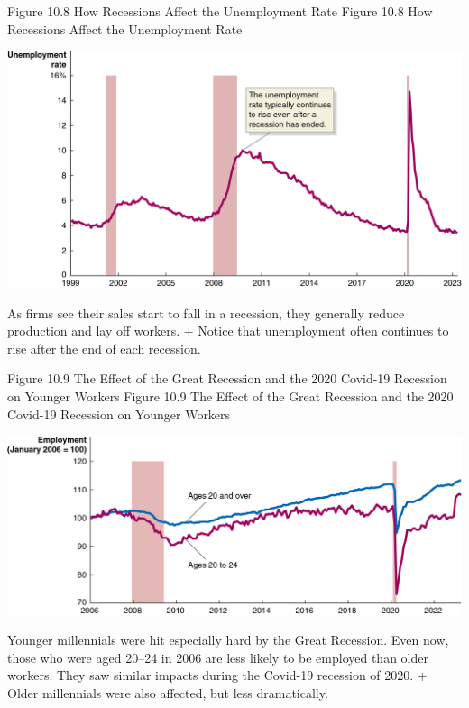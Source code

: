 \documentclass[
  12pt,
  ignorenonframetext,
]{beamer}
\begin{document}
\begin{frame}{Figure 10.8 How Recessions Affect the Unemployment Rate}
\label{figure-10.8-how-recessions-affect-the-unemployment-rate}
Figure 10.8 How Recessions Affect the Unemployment Rate

\includegraphics[width=\textwidth,height=0.99\textheight]{imgs3/img_slide41a.png}

As firms see their sales start to fall in a recession, they generally
reduce production and lay off workers. + Notice that unemployment often
continues to rise after the end of each recession.
\end{frame}

\begin{frame}{Figure 10.9 The Effect of the Great Recession and the 2020
Covid-19 Recession on Younger Workers}
\label{figure-10.9-the-effect-of-the-great-recession-and-the-2020-covid-19-recession-on-younger-workers}
Figure 10.9 The Effect of the Great Recession and the 2020 Covid-19
Recession on Younger Workers

\includegraphics[width=\textwidth,height=0.99\textheight]{imgs3/img_slide42a.png}

Younger millennials were hit especially hard by the Great Recession.
Even now, those who were aged 20--24 in 2006 are less likely to be
employed than older workers. They saw similar impacts during the
Covid-19 recession of 2020. + Older millennials were also affected, but
less dramatically.
\end{frame}
\end{document}
